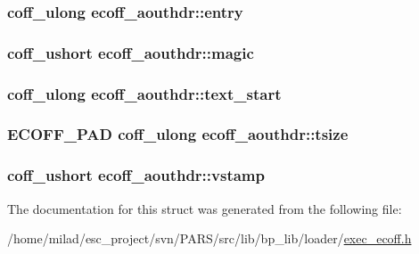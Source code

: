 \label{structecoff__aouthdr_a0e6e28dad22a7a2117e0e326808e5e1c}
\hypertarget{structecoff__aouthdr_a82254009031278d45421007ae6995d4b}{
\subsubsection[{entry}]{\setlength{\rightskip}{0pt plus 5cm}coff\_\-ulong {\bf ecoff\_\-aouthdr::entry}}}
\label{structecoff__aouthdr_a82254009031278d45421007ae6995d4b}
\hypertarget{structecoff__aouthdr_a82d81eb0a575a4bfe6704dd6a39b0512}{
\subsubsection[{magic}]{\setlength{\rightskip}{0pt plus 5cm}coff\_\-ushort {\bf ecoff\_\-aouthdr::magic}}}
\label{structecoff__aouthdr_a82d81eb0a575a4bfe6704dd6a39b0512}
\hypertarget{structecoff__aouthdr_ab4f38b841b2fc8477d5622ba6210b029}{
\subsubsection[{text\_\-start}]{\setlength{\rightskip}{0pt plus 5cm}coff\_\-ulong {\bf ecoff\_\-aouthdr::text\_\-start}}}
\label{structecoff__aouthdr_ab4f38b841b2fc8477d5622ba6210b029}
\hypertarget{structecoff__aouthdr_a5d11e2f0b3845e3ff8b28ecafd7fab68}{
\subsubsection[{tsize}]{\setlength{\rightskip}{0pt plus 5cm}ECOFF\_\-PAD coff\_\-ulong {\bf ecoff\_\-aouthdr::tsize}}}
\label{structecoff__aouthdr_a5d11e2f0b3845e3ff8b28ecafd7fab68}
\hypertarget{structecoff__aouthdr_aef7b0a58b36a3252ef5bb2b840caee06}{
\subsubsection[{vstamp}]{\setlength{\rightskip}{0pt plus 5cm}coff\_\-ushort {\bf ecoff\_\-aouthdr::vstamp}}}
\label{structecoff__aouthdr_aef7b0a58b36a3252ef5bb2b840caee06}


The documentation for this struct was generated from the following file:\begin{DoxyCompactItemize}
\item 
/home/milad/esc\_\-project/svn/PARS/src/lib/bp\_\-lib/loader/\hyperlink{exec__ecoff_8h}{exec\_\-ecoff.h}\end{DoxyCompactItemize}
